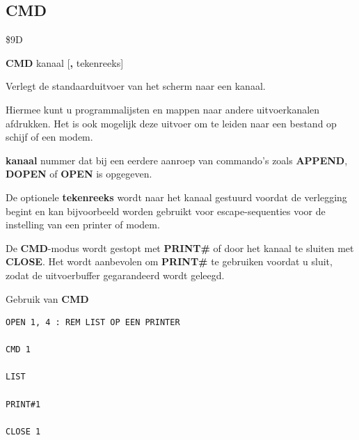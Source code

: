 \subsection{CMD}
\begin{description}[leftmargin=2cm,style=nextline]
\item [Token:]   \$9D

\item [Formaat:]  {\bf CMD} kanaal [{\bf,} tekenreeks]

\item [Gebruik:]   Verlegt de standaarduitvoer van het scherm naar een kanaal.

Hiermee kunt u programmalijsten en mappen naar andere uitvoerkanalen afdrukken. Het is ook mogelijk deze uitvoer om te leiden naar een bestand op schijf of een modem.

                 {\bf kanaal} nummer dat bij een eerdere aanroep van commando's zoals {\bf APPEND}, {\bf DOPEN} of {\bf OPEN} is opgegeven.

                 De optionele {\bf tekenreeks} wordt naar het kanaal gestuurd voordat de verlegging begint en kan bijvoorbeeld worden gebruikt voor escape-sequenties voor de instelling van een printer of modem.

\item [Opmerkingen:] De {\bf CMD}-modus wordt gestopt met {\bf PRINT\#} of door het kanaal te sluiten met {\bf CLOSE}. Het wordt aanbevolen om {\bf PRINT\#} te gebruiken voordat u sluit, zodat de uitvoerbuffer gegarandeerd wordt geleegd.

\item [Voorbeeld:] Gebruik van {\bf CMD}

\begin{tcolorbox}[colback=black,coltext=white]
\verbatimfont{\codefont}
\begin{verbatim}
OPEN 1, 4 : REM LIST OP EEN PRINTER

CMD 1

LIST

PRINT#1

CLOSE 1
\end{verbatim}
\end{tcolorbox}
\end{description}


\newpage
